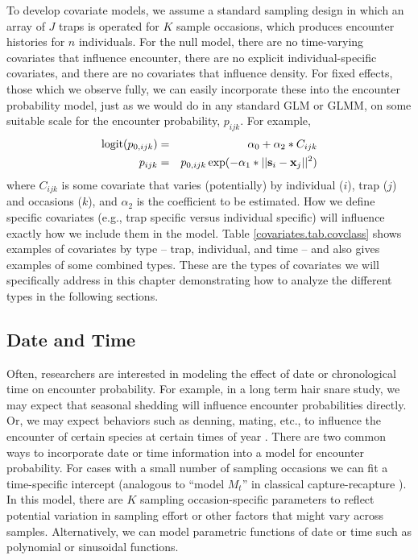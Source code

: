 To develop covariate models, we assume a standard sampling design in which an
array of $J$ traps is operated for $K$ sample occasions, which produces
encounter histories for $n$ individuals.  For the null model, there
are no time-varying covariates that influence encounter, there are no
explicit individual-specific covariates, and there are no covariates
that influence density.  For fixed effects, those which we observe
fully, we can easily incorporate these into the encounter probability
model, just as we would do in any standard GLM or GLMM, on some
suitable scale for the encounter probability, $p_{ijk}$. For example,
\begin{eqnarray*}
\mbox{logit}(p_{0,ijk}) &=& \alpha_0 + \alpha_2*C_{ijk} \\
p_{ijk} &=& p_{0,ijk} \exp(- \alpha_1*||{\bf s}_{i}-{\bf x}_{j}||^2) 
\end{eqnarray*}
where $C_{ijk}$ is some covariate that varies (potentially) by
individual ($i$), trap ($j$) and occasions ($k$), and
$\alpha_2$ is the coefficient to be estimated.
 How we define specific covariates (e.g., trap specific
versus individual specific) will influence exactly how we include them
in the model. Table \ref{covariates.tab.covclass} shows examples of covariates by
type -- trap, individual, and time -- and also gives examples of some combined types.
These are the types of covariates we will specifically address in this chapter demonstrating
how to analyze the different
 types in the following sections.  

\subsection{Date and Time}

Often, researchers are interested in modeling the effect of date or
chronological time on 
encounter probability. For example, in a long term hair snare study,
we may expect that seasonal shedding \citep{wegan_etal:2012} will
influence encounter probabilities directly. Or, we may expect
behaviors such as denning, mating, etc., to influence the encounter of
certain species at certain times of year \citep{kery_etal:2011}.
There are two common ways to incorporate date or time information into
a model for encounter probability. For cases with a small number of
sampling occasions we can fit a time-specific intercept (analogous to
``model $M_{t}$'' in classical capture-recapture
\citep{otis_etal:1978}). In this model, there are $K$ sampling
occasion-specific parameters to reflect potential variation in
sampling effort or other factors that might vary across samples.
Alternatively, we can model parametric functions of date or time such
as polynomial or sinusoidal functions.

